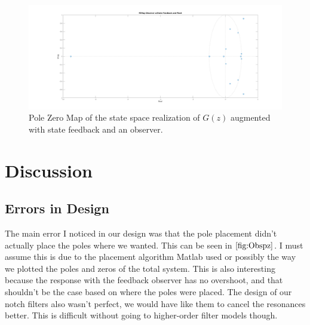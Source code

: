 \documentclass[11pt]{article}
\begin{document}
\begin{figure}[H]
    \centering
    \includegraphics[width=\textwidth]{observer_pz.png}
    \caption{Pole Zero Map of the state space realization of $G(z)$ augmented with state feedback and an observer.}
    \label{fig:Obspz}
\end{figure}

\section{Discussion}
\subsection*{Errors in Design}
The main error I noticed in our design was that the pole placement didn't actually place the poles where we wanted. This can be seen in $\ref{fig:Obspz}$. I must assume this is due to the placement algorithm Matlab used or possibly the way we plotted the poles and zeros of the total system. This is also interesting because the response with the feedback observer has no overshoot, and that shouldn't be the case based on where the poles were placed. The design of our notch filters also wasn't
perfect, we would have like them to cancel the resonances better. This is difficult without going to higher-order filter models though.
\end{document}
